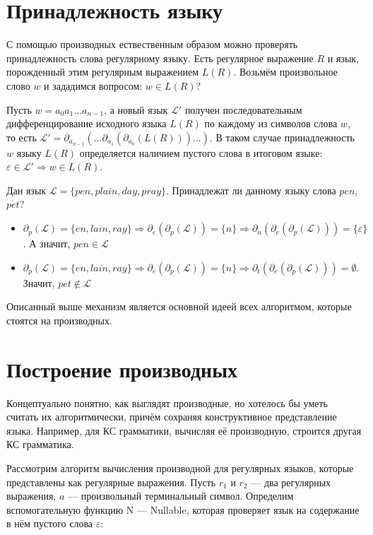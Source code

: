 \section{Принадлежность языку}

С помощью производных ествественным образом можно проверять принадлежность слова регулярному языку.
Есть регулярное выражение $R$ и язык, порожденный этим регулярным выражением $L(R)$. Возьмём произвольное слово $w$ и зададимся вопросом: $w \in L(R)$? 

Пусть $w = a_{0}a_{1}... a_{n-1}$, а новый язык $\mathcal{L'}$ получен последовательным дифференцирование исходного языка $L(R)$ по каждому из символов слова $w$, то есть $\mathcal{L'} = \partial_{a_{n-1}}(...\partial_{a_{1}}(\partial_{a_{0}}(L(R)))...)$. В таком случае принадлежность $w$ языку $L(R)$ определяется наличием пустого слова в итоговом языке: $\varepsilon \in \mathcal{L'} \Rightarrow w \in L(R)$. 

\begin{example}
Дан язык $\mathcal{L} = \{pen, plain, day, pray\}$. Принадлежат ли данному языку слова  $pen$, $pet$?
\begin{itemize}
    \item $\partial_{p}(\mathcal{L}) = \{en, lain, ray\} \Rightarrow \partial_{e}(\partial_{p}(\mathcal{L})) = \{n\} \Rightarrow \partial_{n}(\partial_{e}(\partial_{p}(\mathcal{L}))) = \{\varepsilon\}$. А значит, $pen \in \mathcal{L}$
    \item $\partial_{p}(\mathcal{L}) = \{en, lain, ray\} \Rightarrow \partial_{e}(\partial_{p}(\mathcal{L})) = \{n\} \Rightarrow \partial_{t}(\partial_{e}(\partial_{p}(\mathcal{L}))) = \emptyset$. Значит, $pet \notin \mathcal{L}$
\end{itemize}

\end{example}

Описанный выше механизм является основной идеей всех алгоритмом, которые стоятся на производных. 

\section{Построение производных}

Концептуально понятно, как выглядят производные, но хотелось бы уметь считать их алгоритмически, причём сохраняя конструктивное представление языка. Например, для КС грамматики, вычисляя её производную, строится другая КС грамматика.

Рассмотрим алгоритм вычисления производной для регулярных языков, которые представлены как регулярные выражения. Пусть $r_{1}$ и $r_{2}$ ---  два регулярных выражения, $a$ --- произвольный терминальный символ. Определим вспомогательную функцию N --- Nullable, которая проверяет язык на содержание в нём пустого слова $\varepsilon$:

